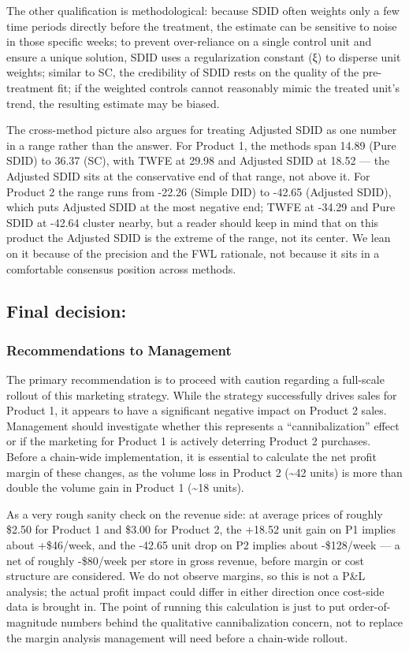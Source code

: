 \documentclass[
  letterpaper,
  DIV=11,
  numbers=noendperiod]{scrartcl}
\begin{document}
The other qualification is methodological: because SDID often weights
only a few time periods directly before the treatment, the estimate can
be sensitive to noise in those specific weeks; to prevent over-reliance
on a single control unit and ensure a unique solution, SDID uses a
regularization constant (ξ) to disperse unit weights; similar to SC, the
credibility of SDID rests on the quality of the pre-treatment fit; if
the weighted controls cannot reasonably mimic the treated unit's trend,
the resulting estimate may be biased.

The cross-method picture also argues for treating Adjusted SDID as one
number in a range rather than the answer. For Product 1, the methods
span 14.89 (Pure SDID) to 36.37 (SC), with TWFE at 29.98 and Adjusted
SDID at 18.52 --- the Adjusted SDID sits at the conservative end of that
range, not above it. For Product 2 the range runs from -22.26 (Simple
DID) to -42.65 (Adjusted SDID), which puts Adjusted SDID at the most
negative end; TWFE at -34.29 and Pure SDID at -42.64 cluster nearby, but
a reader should keep in mind that on this product the Adjusted SDID is
the extreme of the range, not its center. We lean on it because of the
precision and the FWL rationale, not because it sits in a comfortable
consensus position across methods.

\subsection{Final decision:}\label{final-decision}

\subsubsection{Recommendations to
Management}\label{recommendations-to-management}

The primary recommendation is to proceed with caution regarding a
full-scale rollout of this marketing strategy. While the strategy
successfully drives sales for Product 1, it appears to have a
significant negative impact on Product 2 sales. Management should
investigate whether this represents a ``cannibalization'' effect or if
the marketing for Product 1 is actively deterring Product 2 purchases.
Before a chain-wide implementation, it is essential to calculate the net
profit margin of these changes, as the volume loss in Product 2
(\textasciitilde42 units) is more than double the volume gain in Product
1 (\textasciitilde18 units).

As a very rough sanity check on the revenue side: at average prices of
roughly \$2.50 for Product 1 and \$3.00 for Product 2, the +18.52 unit
gain on P1 implies about +\$46/week, and the -42.65 unit drop on P2
implies about -\$128/week --- a net of roughly -\$80/week per store in
gross revenue, before margin or cost structure are considered. We do not
observe margins, so this is not a P\&L analysis; the actual profit
impact could differ in either direction once cost-side data is brought
in. The point of running this calculation is just to put
order-of-magnitude numbers behind the qualitative cannibalization
concern, not to replace the margin analysis management will need before
a chain-wide rollout.
\end{document}
